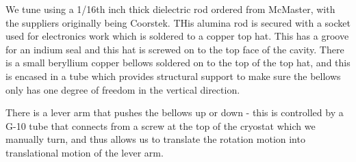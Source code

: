 \documentclass[11pt]{article}
\begin{document}
We tune using a 1/16th inch thick dielectric rod ordered from McMaster, with the suppliers originally being Coorstek. THis alumina rod is secured with a socket used for electronics work which is soldered to a copper top hat. This has a groove for an indium seal and this hat is screwed on to the top face of the cavity. There is a small beryllium copper bellows soldered on to the top of the top hat, and this is encased in a tube which provides structural support to make sure the bellows only has one degree of freedom in the vertical direction. 

There is a lever arm that pushes the bellows up or down - this is controlled by a G-10 tube that connects from a screw at the top of the cryostat which we manually turn, and thus allows us to translate the rotation motion into translational motion of the lever arm. 
\end{document}
